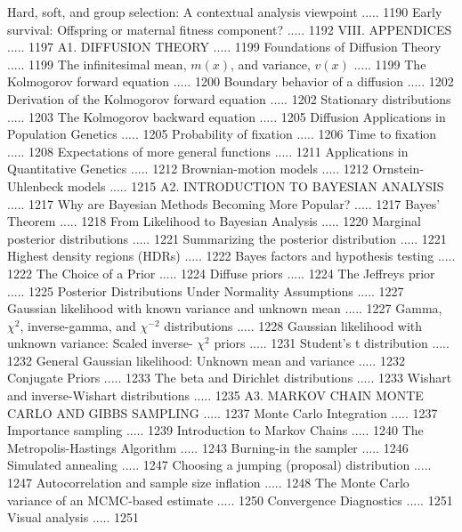 \documentclass{article}
\begin{document}
Hard, soft, and group selection: A contextual analysis viewpoint ..... 1190
Early survival: Offspring or maternal fitness component? ..... 1192
VIII. APPENDICES ..... 1197
A1. DIFFUSION THEORY ..... 1199
Foundations of Diffusion Theory ..... 1199
The infinitesimal mean,  $ m(x) $, and variance,  $ v(x) $ ..... 1199
The Kolmogorov forward equation ..... 1200
Boundary behavior of a diffusion ..... 1202
Derivation of the Kolmogorov forward equation ..... 1202
Stationary distributions ..... 1203
The Kolmogorov backward equation ..... 1205
Diffusion Applications in Population Genetics ..... 1205
Probability of fixation ..... 1206
Time to fixation ..... 1208
Expectations of more general functions ..... 1211
Applications in Quantitative Genetics ..... 1212
Brownian-motion models ..... 1212
Ornstein-Uhlenbeck models ..... 1215
A2. INTRODUCTION TO BAYESIAN ANALYSIS ..... 1217
Why are Bayesian Methods Becoming More Popular? ..... 1217
Bayes' Theorem ..... 1218
From Likelihood to Bayesian Analysis ..... 1220
Marginal posterior distributions ..... 1221
Summarizing the posterior distribution ..... 1221
Highest density regions (HDRs) ..... 1222
Bayes factors and hypothesis testing ..... 1222
The Choice of a Prior ..... 1224
Diffuse priors ..... 1224
The Jeffreys prior ..... 1225
Posterior Distributions Under Normality Assumptions ..... 1227
Gaussian likelihood with known variance and unknown mean ..... 1227
Gamma,  $ \chi^{2} $, inverse-gamma, and  $ \chi^{-2} $ distributions ..... 1228
Gaussian likelihood with unknown variance: Scaled inverse- $ \chi^{2} $ priors ..... 1231
Student's t distribution ..... 1232
General Gaussian likelihood: Unknown mean and variance ..... 1232
Conjugate Priors ..... 1233
The beta and Dirichlet distributions ..... 1233
Wishart and inverse-Wishart distributions ..... 1235
A3. MARKOV CHAIN MONTE CARLO AND GIBBS SAMPLING ..... 1237
Monte Carlo Integration ..... 1237
Importance sampling ..... 1239
Introduction to Markov Chains ..... 1240
The Metropolis-Hastings Algorithm ..... 1243
Burning-in the sampler ..... 1246
Simulated annealing ..... 1247
Choosing a jumping (proposal) distribution ..... 1247
Autocorrelation and sample size inflation ..... 1248
The Monte Carlo variance of an MCMC-based estimate ..... 1250
Convergence Diagnostics ..... 1251
Visual analysis ..... 1251
\end{document}
